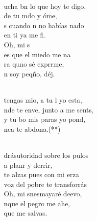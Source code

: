 \documentclass[12pt]{article}
\begin{document}
\begin{multicols*}{2}
\begin{cancion}%
	    \\
	ucha bn lo que hoy te digo,\\
	 de tu mdo y óme, \\
	s cuando n no habías nado \\
	 en ti ya me fi. \\
	Oh, mi s\\
	es que el miedo me na\\
	ra quno sé exprrme,\\
	n soy peqño, déj. \\\jump\\
	\begin{chorus}%
	 tengas mio, a tu l yo esta,\\
	nde te enve, junto a me sents, \\
	y  tu bo mis paras yo pond,\\
	nca te abdona.(**)\\
	\end{chorus}%
	\jump\\
	drásutoridad sobre los pulos\\
	a planr y derrir,\\
	 te alzas pues con mi erza \\
	 voz del pobre te transforrás\\
	Oh, mi snesmayaré deevo,\\
	nque el pegro me ahe,\\
	 que  me salvas.  \\\jump\\

\end{cancion}
\end{multicols*}
\end{document}
